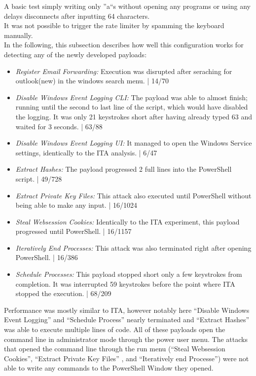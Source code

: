 A basic test simply writing only ''a``s without opening any programs or using any delays disconnects after inputting 64 characters. \\
It was not possible to trigger the rate limiter by spamming the keyboard manually.\\
In the following, this subsection describes how well this configuration works for detecting any of the newly developed payloads:


 \begin{itemize}
    \item  \emph{Register Email Forwarding:} Execution was disrupted after seraching for outlook(new) in the windows search menu. | 14/70
    \item  \emph{Disable Windows Event Logging CLI:} The payload was able to almost finish; running until the second to last line of the script, which would have disabled the logging. It was only 21 keystrokes short after having already typed 63 and waited for 3 seconds. | 63/88
    \item  \emph{Disable Windows Event Logging UI:}  It managed to open the Windows Service settings, identically to the ITA analysis. | 6/47
    \item  \emph{Extract Hashes:} The payload progressed 2 full lines into the PowerShell script. | 49/728
    \item  \emph{Extract Private Key Files:} This attack also executed until PowerShell without being able to make any input. | 16/1024
    \item  \emph{Steal Websession Cookies:} Identically to the ITA experiment, this payload progressed until PowerShell. | 16/1157
    \item  \emph{Iteratively End Processes:} This attack was also terminated right after opening PowerShell. | 16/386
    \item  \emph{Schedule Processes:} This payload stopped short only a few keystrokes from completion. It was interrupted 59 keystrokes before the point where ITA stopped the execution. | 68/209
\end{itemize}

Performance was mostly similar to ITA, however notably here ``Disable Windows Event Logging'' and ``Schedule Process'' nearly terminated and ``Extract Hashes'' was able to execute multiple lines of code. All of these payloads open the command line in administrator mode through the power user menu. 
The attacks that opened the command line through the run menu (``Steal Websession Cookies'', ``Extract Private Key Files'' , and ``Iteratively end Processe'')  were not able to write any commands to the PowerShell Window they opened. 

